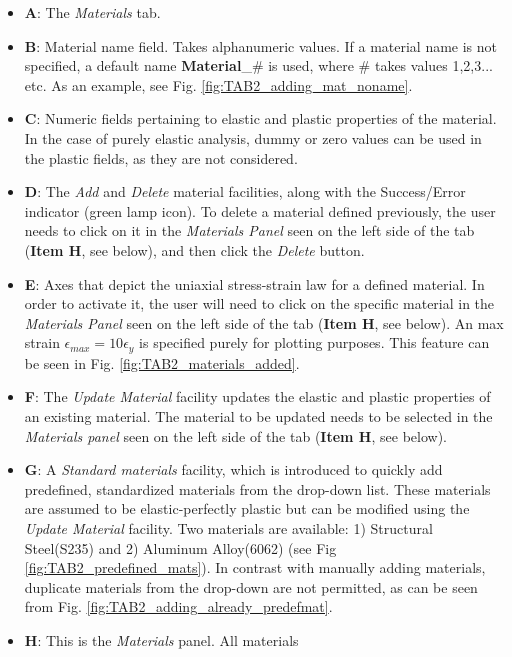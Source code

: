 \begin{appendices}
\begin{itemize}
	\item \textbf{A}: The \textit{Materials} tab.
	\item \textbf{B}: Material name field. Takes alphanumeric values. If a 
	material name is not specified, a default name \textbf{Material}\_$\#$ is 
	used, where $\#$ takes values 1,2,3... etc. As an example, see Fig. 
	\ref{fig:TAB2_adding_mat_noname}.
	\item \textbf{C}: Numeric fields pertaining to elastic and plastic 
	properties of the material. In the case of purely elastic analysis, dummy 
	or zero values can be used in the plastic fields, as they are not 
	considered.
	\item \textbf{D}: The \textit{Add} and \textit{Delete} material facilities, 
	along with the Success/Error indicator (green lamp icon). To delete a 
	material defined previously, the user needs to click on it in the 
	\textit{Materials Panel} seen on the left side of the tab (\textbf{Item H}, 
	see below), and then click the \textit{Delete} button.
	\item \textbf{E}: Axes that depict the uniaxial stress-strain law for a 
	defined material. In order to activate it, the user will need to click on 
	the specific material in the \textit{Materials Panel} seen on the left side 
	of the tab (\textbf{Item H}, see below). An max strain 
	$\epsilon_{max}=10\epsilon_y$ is specified purely for plotting purposes. 
	This feature can be seen in Fig. \ref{fig:TAB2_materials_added}.
	\item \textbf{F}: The \textit{Update Material} facility updates the elastic 
	and plastic properties of an existing material. The material to be updated 
	needs to be selected in the \textit{Materials panel} seen on the left side 
	of the tab (\textbf{Item H}, see below). 
	\item \textbf{G}: A \textit{Standard materials} facility, which is 
	introduced to quickly add predefined, standardized materials from the 
	drop-down list. These materials are assumed to be elastic-perfectly plastic 
	but can be modified using the \textit{Update Material} facility. Two 
	materials are available: 1) Structural Steel(S235) and 2) Aluminum 
	Alloy(6062) (see Fig \ref{fig:TAB2_predefined_mats}). In contrast with 
	manually adding materials, duplicate 
	materials from the drop-down are not permitted, as can be seen from Fig. 
	\ref{fig:TAB2_adding_already_predefmat}. 
	\item \textbf{H}: This is the \textit{Materials} panel. All materials 

\end{itemize}
\end{appendices}
